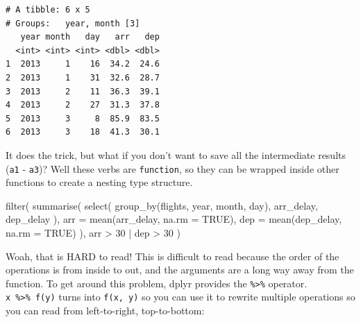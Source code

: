 \documentclass[
  letterpaper,
  DIV=11,
  numbers=noendperiod,
  oneside]{scrreprt}
\newenvironment{Shaded}{\begin{snugshade}}{\end{snugshade}}
\newcommand{\AttributeTok}[1]{\textcolor[rgb]{0.40,0.45,0.13}{#1}}
\newcommand{\ConstantTok}[1]{\textcolor[rgb]{0.56,0.35,0.01}{#1}}
\newcommand{\DecValTok}[1]{\textcolor[rgb]{0.68,0.00,0.00}{#1}}
\newcommand{\FunctionTok}[1]{\textcolor[rgb]{0.28,0.35,0.67}{#1}}
\newcommand{\NormalTok}[1]{\textcolor[rgb]{0.00,0.23,0.31}{#1}}
\newcommand{\SpecialCharTok}[1]{\textcolor[rgb]{0.37,0.37,0.37}{#1}}
\begin{document}
\begin{verbatim}
# A tibble: 6 x 5
# Groups:   year, month [3]
   year month   day   arr   dep
  <int> <int> <int> <dbl> <dbl>
1  2013     1    16  34.2  24.6
2  2013     1    31  32.6  28.7
3  2013     2    11  36.3  39.1
4  2013     2    27  31.3  37.8
5  2013     3     8  85.9  83.5
6  2013     3    18  41.3  30.1
\end{verbatim}

It does the trick, but what if you don't want to save all the
intermediate results (\texttt{a1} - \texttt{a3})? Well these verbs are
\texttt{function}, so they can be wrapped inside other functions to
create a nesting type structure.

\begin{Shaded}
\begin{Highlighting}[]
\FunctionTok{filter}\NormalTok{(}
  \FunctionTok{summarise}\NormalTok{(}
    \FunctionTok{select}\NormalTok{(}
      \FunctionTok{group\_by}\NormalTok{(flights, year, month, day),}
\NormalTok{      arr\_delay, dep\_delay}
\NormalTok{    ),}
    \AttributeTok{arr =} \FunctionTok{mean}\NormalTok{(arr\_delay, }\AttributeTok{na.rm =} \ConstantTok{TRUE}\NormalTok{),}
    \AttributeTok{dep =} \FunctionTok{mean}\NormalTok{(dep\_delay, }\AttributeTok{na.rm =} \ConstantTok{TRUE}\NormalTok{)}
\NormalTok{  ),}
\NormalTok{  arr }\SpecialCharTok{\textgreater{}} \DecValTok{30} \SpecialCharTok{|}\NormalTok{ dep }\SpecialCharTok{\textgreater{}} \DecValTok{30}
\NormalTok{)}
\end{Highlighting}
\end{Shaded}

Woah, that is HARD to read! This is difficult to read because the order
of the operations is from inside to out, and the arguments are a long
way away from the function. To get around this problem, dplyr provides
the \texttt{\%\textgreater{}\%} operator.
\texttt{x\ \%\textgreater{}\%\ f(y)} turns into \texttt{f(x,\ y)} so you
can use it to rewrite multiple operations so you can read from
left-to-right, top-to-bottom:
\end{document}
